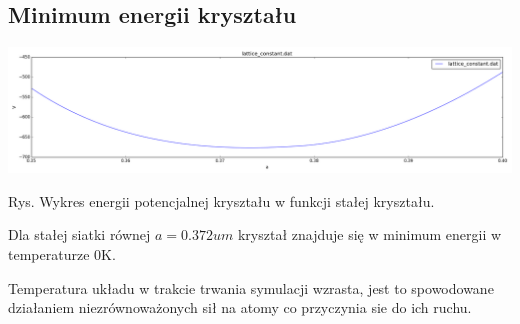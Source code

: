 \documentclass[polish,polish,a4paper,11pt]{article}
\begin{document}
\subsection{Minimum energii kryształu}
\begin{center}
\includegraphics[scale=0.3]{../Data/lattice_constant.png}
\end{center}
\begin{center}
Rys.  Wykres energii potencjalnej kryształu w funkcji stałej kryształu.
\end{center}
Dla stałej siatki równej $a=0.372um$ kryształ znajduje się w minimum energii w temperaturze 0K. 

Temperatura układu w trakcie trwania symulacji wzrasta, jest to spowodowane działaniem niezrównoważonych sił na atomy co przyczynia sie do ich ruchu.
 
\end{document}
